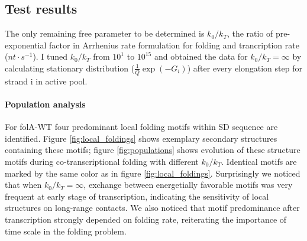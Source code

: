 \documentclass[11pt, a4paper]{article}
\begin{document}
\subsection{Test results}

The only remaining free parameter to be determined is $k_0/k_T$, the ratio of pre-exponential factor in Arrhenius rate formulation for folding and trancription rate ($nt\cdot s^{-1}$). I tuned $k_0/k_T$ from $10^{1}$ to $10^{15}$ and obtained the data for $k_0/k_T=\infty$ by calculating stationary distribution ($\frac{1}{Q}\exp(-G_i)$) after every elongation step for strand i in active pool.
 
\paragraph{Population analysis} For folA-WT four predominant local folding motifs within SD sequence are identified. Figure \ref{fig:local_foldings} shows exemplary secondary structures containing these motifs; figure \ref{fig:populations} shows evolution of these structure motifs during co-transcriptional folding with different $k_0/k_T$. Identical motifs are marked by the same color as in figure \ref{fig:local_foldings}. Surprisingly we noticed that when $k_0/k_T=\infty$, exchange between energetially favorable motifs was very frequent at early stage of transcription, indicating the sensitivity of local structures on long-range contacts. We also noticed that motif predominance after transcription strongly depended on folding rate, reiterating the importance of time scale in the folding problem.
\end{document}
